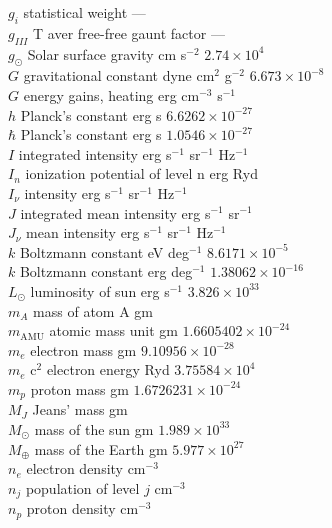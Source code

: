 \begin{tabbing}
$g_i$ \>  statistical weight \> ---\\
$g_{III}$ \>  T
aver free-free gaunt factor \> ---\\
$g_\odot$ \>  Solar surface gravity \>  cm
s$^{-2}$ \>  $2.74\times 10^4$\\
$G$ \> gravitational constant \>  dyne cm$^2$ g$^{-2}$ \>  $6.673\times 10^{-8}$\\
$G$ \>  energy gains,
heating \>  erg cm$^{-3}$ s$^{-1}$\\
$h$ \>  Planck's constant \>  erg s \>  $6.6262\times 10^{-27}$\\
$\hbar $ \>  Planck's constant \>  erg s \>   $1.0546\times 10^{-27}$\\
$I$ \>  integrated intensity \>  erg s$^{-1}$ sr$^{-1}$ Hz$^{-1}$\\
$I_n$ \>  ionization potential of level n \>   erg Ryd\\
$I_\nu$ \>  intensity \>  erg s$^{-1}$ sr$^{-1}$ Hz$^{-1}$\\
$J$ \>  integrated mean intensity \>  erg s$^{-1}$ sr$^{-1}$\\
$J_\nu$ \>  mean intensity \>  erg s$^{-1}$ sr$^{-1}$ Hz$^{-1}$\\
$k$ \>  Boltzmann constant \>  eV deg$^{-1}$ \> $8.6171\times 10^{-5}$\\
$k$ \>  Boltzmann constant \>  erg deg$^{-1}$ \>  $1.38062\times 10^{-16}$\\
$L_\odot$ \>  luminosity of sun \>  erg s$^{-1}$ \>  $3.826\times10^{33}$\\
$m_A$ \>  mass  of atom A \>  gm\\
$m_{\mathrm{AMU}}$ \>  atomic mass unit \>  gm \>  $1.6605402\times10^{-24}$\\
$m_e$ \>  electron mass \>  gm \>  $9.10956\times 10^{-28}$\\
$m_e$ c$^2$ \>  electron energy \>  Ryd \>  $3.75584\times10^4$\\
$m_p$ \>  proton mass \>  gm \>  $1.6726231\times 10^{-24}$\\
$M_J$ \>  Jeans' mass \>  gm\\
$M_\odot$ \>  mass of the sun \>  gm \>  $1.989\times 10^{33}$\\
$M_\oplus$ \>  mass of the Earth \>  gm \>  $5.977\times 10^{27}$\\
$n_e$ \>  electron
density \>  cm$^{-3}$\\
$n_j$ \>  population of level $j$ \>  cm$^{-3}$\\
$n_p$ \>  proton density \> cm$^{-3}$\\

\end{tabbing}
